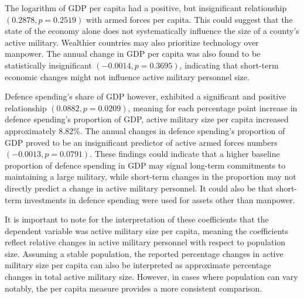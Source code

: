 The logarithm of GDP per capita had a positive, but insignificant relationship $(0.2878, p=0.2519)$ 
with armed forces per capita. This could suggest that the state of the economy alone does not 
systematically influence the size of a county's active military. Wealthier countries may also
prioritize technology over manpower.
The annual change in GDP per capita was also found to be 
statistically insignificant $(-0.0014, p=0.3695)$,
indicating that short-term economic changes might not influence active military personnel size. 

Defence spending's share of GDP however, exhibited 
a significant and positive relationship $(0.0882, p=0.0209)$, meaning for each percentage point increase in defence spending's 
proportion of GDP, active military size per capita increased approximately 8.82\%.
The annual changes in defence spending's proportion of GDP proved to be an insignificant predictor
of active armed forces numbers $(-0.0013, p=0.0791)$. 
These findings could indicate that a higher baseline proportion of defence 
spending in GDP may signal long-term commitments to maintaining a large military, while short-term 
changes in the proportion may not directly predict a change in active military personnel. It could 
also be that short-term investments in defence spending were used for assets other than manpower.

It is important to note for the interpretation of these coefficients that the dependent variable was 
active military size per capita, meaning the coefficients reflect relative changes in active military personnel 
with respect to population size. Assuming a stable population, the reported percentage changes 
in active military size per capita can also be interpreted as approximate percentage changes in total 
active military size. However, in cases where population can vary notably, the per capita measure provides 
a more consistent comparison.

